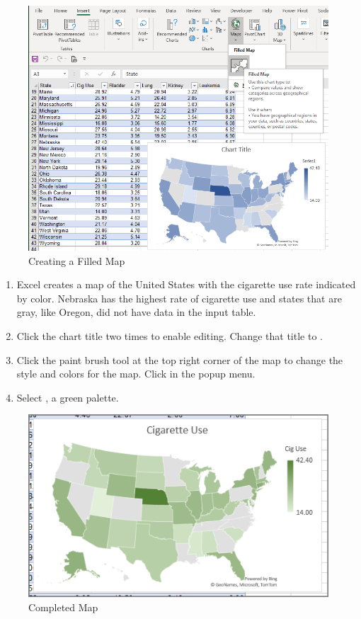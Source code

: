 \begin{figure}[H]
	\centering
	\includegraphics[width=\maxwidth{.95\linewidth}]{gfx/ch08_fig15}
	\caption{Creating a Filled Map}
	\label{08:fig15}
\end{figure}

\begin{enumerate}[resume]	
	\item Excel creates a map of the United States with the cigarette use rate indicated by color. Nebraska has the highest rate of cigarette use and states that are gray, like Oregon, did not have data in the input table.
	\item Click the chart title two times to enable editing. Change that title to .
	\item Click the paint brush tool at the top right corner of the map to change the style and colors for the map. Click  in the popup menu.
	\item Select , a green palette.
\end{enumerate}

\begin{figure}[H]
	\centering
	\includegraphics[width=\maxwidth{.95\linewidth}]{gfx/ch08_fig16}
	\caption{Completed Map}
	\label{08:fig16}
\end{figure}

